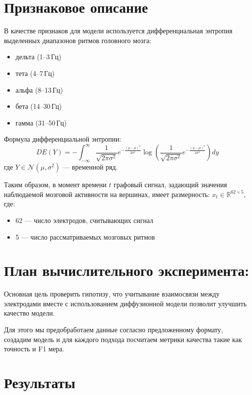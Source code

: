 \documentclass[12pt, twoside]{article}
\begin{document}
\section{Признаковое описание}

В качестве признаков для модели используется дифференциальная энтропия выделенных диапазонов ритмов головного мозга:
\begin{itemize}
    \item дельта (1--3\,Гц)
    \item тета (4--7\,Гц)
    \item альфа (8--13\,Гц)
    \item бета (14--30\,Гц)
    \item гамма (31--50\,Гц)
\end{itemize}

Формула дифференциальной энтропии:
\begin{equation}
DE(Y) = -\int_{-\infty}^{\infty} \frac{1}{\sqrt{2\pi\sigma^2}} e^{-\frac{(y - \mu)^2}{2\sigma^2}} \log \left( \frac{1}{\sqrt{2\pi\sigma^2}} e^{-\frac{(y - \mu)^2}{2\sigma^2}} \right) dy
\end{equation}
где $Y \in \mathcal{N}(\mu, \sigma^2)$ --- временной ряд.

Таким образом, в момент времени $t$ графовый сигнал, задающий значения наблюдаемой мозговой активности на вершинах, имеет размерность:
\(
x_t \in \mathbb{R}^{62 \times 5},
\)
где:
\begin{itemize}
    \item 62 --- число электродов, считывающих сигнал
    \item 5 --- число рассматриваемых мозговых ритмов
\end{itemize}

\section{План вычислительного эксперимента:}
Основная цель проверить гипотизу, что учитывание взаимосвязи между электродами вместе с использованием диффузионной модели позволит улучшить качество модели.

Для этого мы предобработаем данные согласно предложенному формату, создадим модель и для каждого подхода посчитаем метрики качества такие как точность и F1 мера.




\section{Результаты}
\end{document}
